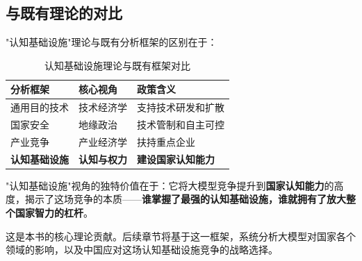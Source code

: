 \subsection{与既有理论的对比}

"认知基础设施"理论与既有分析框架的区别在于：

\begin{table}[H]
\centering
\caption{认知基础设施理论与既有框架对比}
\small
\begin{tabular}{p{3cm}p{4cm}p{4.5cm}}
\toprule
\textbf{分析框架} & \textbf{核心视角} & \textbf{政策含义} \\
\midrule
通用目的技术 & 技术经济学 & 支持技术研发和扩散 \\
国家安全 & 地缘政治 & 技术管制和自主可控 \\
产业竞争 & 产业经济学 & 扶持重点企业 \\
\textbf{认知基础设施} & \textbf{认知与权力} & \textbf{建设国家认知能力} \\
\bottomrule
\end{tabular}
\end{table}

"认知基础设施"视角的独特价值在于：它将大模型竞争提升到\textbf{国家认知能力}的高度，揭示了这场竞争的本质——\textbf{谁掌握了最强的认知基础设施，谁就拥有了放大整个国家智力的杠杆}。

这是本书的核心理论贡献。后续章节将基于这一框架，系统分析大模型对国家各个领域的影响，以及中国应对这场认知基础设施竞争的战略选择。
